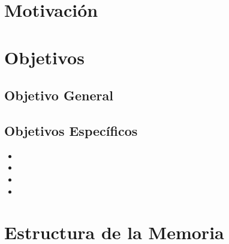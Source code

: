 
\section{Motivación}


\section{Objetivos}

\subsection{Objetivo General}

\subsection{Objetivos Específicos}
\begin{itemize}
    \item %
    \item %
    \item %
    \item %
\end{itemize}


\section{Estructura de la Memoria}
